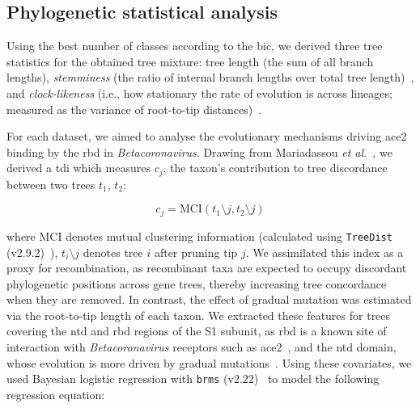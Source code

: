 
\subsection{Phylogenetic statistical analysis}
Using the best number of classes according to the \gls{bic}, we derived three tree statistics for the obtained tree mixture: tree length (the sum of all branch lengths), \emph{stemminess} (the ratio of internal branch lengths over total tree length)~\cite{fiala1985, rohlf1990}, and \emph{clock-likeness} (i.e., how stationary the rate of evolution is across lineages; measured as the variance of root-to-tip distances)~\cite{zuckerkandl1962, zuckerkandl1965}.

For each dataset, we aimed to analyse the evolutionary mechanisms driving \gls{ace2} binding by the \gls{rbd} in \textit{Betacoronavirus}. Drawing from Mariadassou \textit{et al.}~\cite{mariadassou2012}, we derived a \gls{tdi} which measures $c_j$, the taxon's contribution to tree discordance between two trees $t_1$, $t_2$:

\begin{equation}
    c_j = \text{MCI}(t_1 \setminus j, t_2 \setminus j)
\end{equation}

where MCI denotes mutual clustering information (calculated using \texttt{TreeDist} (v2.9.2)~\cite{smith2020}), $t_i \setminus j$ denotes tree $i$ after pruning tip $j$. We assimilated this index as a proxy for recombination, as recombinant taxa are expected to occupy discordant phylogenetic positions across gene trees, thereby increasing tree concordance when they are removed. In contrast, the effect of gradual mutation was estimated via the root-to-tip length of each taxon. We extracted these features for trees covering the \gls{ntd} and \gls{rbd} regions of the S1 subunit, as \gls{rbd} is a known site of interaction with \textit{Betacoronavirus} receptors such as \gls{ace2}~\cite{li2016, lan2020, walls2020, wrobel2020, starr2022}, and the \gls{ntd} domain, whose evolution is more driven by gradual mutations~\cite{boni2020, deklerk2022}. Using these covariates, we used Bayesian logistic regression with \texttt{brms} (v2.22)~\cite{burkner2017} to model the following regression equation:


